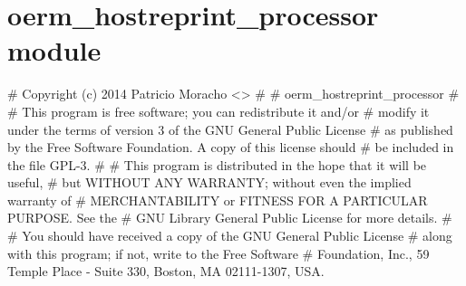 \documentclass[a4paper,12pt,spanish]{sphinxmanual}
\begin{document}

\begin{fulllineitems}
\label{\detokenize{make:make.subprocess_cmd}}
\end{fulllineitems}



\section{oerm\_hostreprint\_processor module}
\label{\detokenize{oerm_hostreprint_processor:module-oerm_hostreprint_processor}}\label{\detokenize{oerm_hostreprint_processor:oerm-hostreprint-processor-module}}\label{\detokenize{oerm_hostreprint_processor::doc}}
\# Copyright (c) 2014 Patricio Moracho \textless{}\textgreater{}
\#
\# oerm\_hostreprint\_processor
\#
\# This program is free software; you can redistribute it and/or
\# modify it under the terms of version 3 of the GNU General Public License
\# as published by the Free Software Foundation. A copy of this license should
\# be included in the file GPL-3.
\#
\# This program is distributed in the hope that it will be useful,
\# but WITHOUT ANY WARRANTY; without even the implied warranty of
\# MERCHANTABILITY or FITNESS FOR A PARTICULAR PURPOSE.  See the
\# GNU Library General Public License for more details.
\#
\# You should have received a copy of the GNU General Public License
\# along with this program; if not, write to the Free Software
\# Foundation, Inc., 59 Temple Place - Suite 330, Boston, MA 02111-1307, USA.

\begin{fulllineitems}
\label{\detokenize{oerm_hostreprint_processor:oerm_hostreprint_processor.Main}}
\end{fulllineitems}

\end{document}
